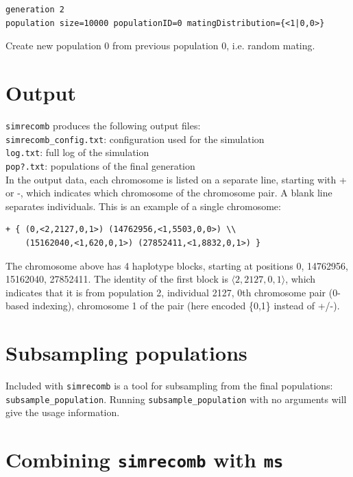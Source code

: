 \documentclass{article}
\begin{document}
\begin{verbatim}
generation 2
population size=10000 populationID=0 matingDistribution={<1|0,0>}
\end{verbatim}

\noindent Create new population 0 from previous population 0, i.e. random mating.


\section*{Output}

\texttt{simrecomb} produces the following output files: \\

\noindent
\texttt{simrecomb\_config.txt}:  configuration used for the simulation \\
\texttt{log.txt}:  full log of the simulation \\
\texttt{pop?.txt}:  populations of the final generation \\

\noindent In the output data, each chromosome is listed on a separate
line, starting with + or -, which indicates which chromosome of the 
chromosome pair.  A blank line separates individuals. 
This is an example of a single chromosome:
\begin{verbatim}
+ { (0,<2,2127,0,1>) (14762956,<1,5503,0,0>) \\
    (15162040,<1,620,0,1>) (27852411,<1,8832,0,1>) }
\end{verbatim}

\noindent The chromosome above has 4 haplotype
blocks, starting at positions 0, 14762956, 15162040, 27852411.  The identity of
the first block is $\langle 2,2127,0,1 \rangle$, which indicates that it is from
population 2, individual 2127, 0th chromosome pair (0-based indexing),
chromosome 1 of the pair (here encoded \{0,1\} instead of +/-).


\section*{Subsampling populations}

\noindent Included with \texttt{simrecomb} is a tool for subsampling from the
final populations: \texttt{subsample\_population}.  Running
\texttt{subsample\_population} with no arguments will give the usage
information. \\


\section*{Combining \texttt{simrecomb} with \texttt{ms}}
\end{document}
